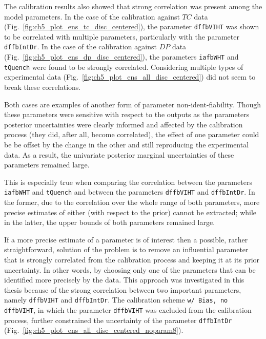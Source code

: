The calibration results also showed that strong correlation was pres\-ent among the model parameters.
In the case of the calibration against $TC$ data (Fig.~\ref{fig:ch5_plot_ens_tc_disc_centered}), the parameter \texttt{dffbVIHT} was shown to be correlated with multiple parameters, particularly with the parameter \texttt{dffbIntDr}.
In the case of the calibration against $DP$ data (Fig.~\ref{fig:ch5_plot_ens_dp_disc_centered}), the parameters \texttt{iafbWHT} and \texttt{tQuench} were found to be strongly correlated. 
Considering multiple types of experimental data (Fig.~\ref{fig:ch5_plot_ens_all_disc_centered}) did not seem to break these correlations.

Both cases are examples of another form of parameter non-ident-fiability.
Though these parameters were sensitive with respect to the outputs as the parameters posterior uncertainties were clearly informed and affected by the calibration process (they did, after all, become correlated), 
the effect of one parameter could be be offset by the change in the other and still reproducing the experimental data. 
As a result, the univariate posterior marginal uncertainties of these parameters remained large.

This is especially true when comparing the correlation between the parameters \texttt{iafbWHT} and \texttt{tQuench} and between the parameters \texttt{dffbVIHT} and \texttt{dffbIntDr}. 
In the former, due to the correlation over the whole range of both parameters, more precise estimates of either (with respect to the prior) cannot be extracted;
while in the latter, the upper bounds of both parameters remained large.

If a more precise estimate of a parameter is of interest then a possible, rather straightforward, solution of the problem is to remove an influential parameter that is strongly correlated from the calibration process \cite{Brun2002} and keeping it at its prior uncertainty.
In other words, by choosing only one of the parameters that can be identified more precisely by the data.
This approach was investigated in this thesis because of the strong correlation between two important parameters, namely \texttt{dffbVIHT} and \texttt{dffbIntDr}.
The calibration scheme \texttt{w/ Bias, no dffbVIHT}, in which the parameter \texttt{dffbVIHT} was excluded from the calibration process, further constrained the uncertainty of the parameter \texttt{dffbIntDr} (Fig.~\ref{fig:ch5_plot_ens_all_disc_centered_noparam8}).

